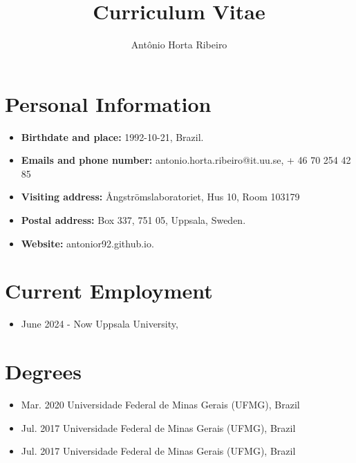 \documentclass[10pt,A4]{article} %
\title{Curriculum Vitae}
\author{Ant\^onio Horta Ribeiro}
\date{}
\begin{document}
\maketitle
\small



\section{Personal Information}

\begin{itemize}
\item {\bf Birthdate and place:} 1992-10-21, Brazil.
\item {\bf Emails and phone number:} antonio.horta.ribeiro@it.uu.se,  + 46 70 254 42 85
\item {\bf Visiting address:}  Ångströmslaboratoriet, Hus 10, Room 103179
\item {\bf Postal address:} Box 337, 751 05, Uppsala, Sweden.
\item {\bf Website:} antonior92.github.io.
\end{itemize}

\section{Current Employment}

\begin{itemize}
\item {}
    { June 2024 -  Now }
    { Uppsala University,  }{}{}
\end{itemize}



\section{Degrees}


\begin{itemize}

    \item {}
    { Mar. 2020 }
    { Universidade Federal de Minas Gerais (UFMG), Brazil }{}

    \item {}
    { Jul. 2017 }
    { Universidade Federal de Minas Gerais (UFMG), Brazil }{}

    \item {}
    { Jul. 2017 }
    { Universidade Federal de Minas Gerais (UFMG), Brazil }{}

\end{itemize}
\end{document}
